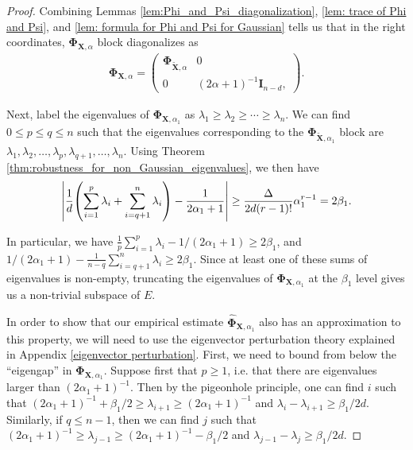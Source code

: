 \documentclass[final,12pt]{colt2018} %
\numberwithin{equation}{section}
\DeclarePairedDelimiter{\abs}{\lvert}{\rvert}
\DeclarePairedDelimiter{\paren}{(}{)}
\newcommand{\boldPhi}{\boldsymbol{\Phi}}
\newcommand{\boldI}{\textbf{I}}
\newcommand{\boldX}{\textbf{X}}
\begin{document}
\begin{proof}
	Combining Lemmas \ref{lem:Phi_and_Psi_diagonalization}, \ref{lem: trace of Phi and Psi}, and \ref{lem: formula for Phi and Psi for Gaussian} tells us that in the right coordinates, $\boldPhi_{\boldX,\alpha}$ block diagonalizes as
	\begin{align}
	\boldPhi_{\boldX,\alpha} = \left(
	\begin{array}{c|c}
	\boldPhi_{\tilde{\boldX},\alpha} & 0 \\
	\hline
	0 & (2\alpha+1)^{-1}\boldI_{n-d},
	\end{array}
	\right).
	\end{align}
	
	Next, label the eigenvalues of $\boldPhi_{\boldX,\alpha_1}$ as $\lambda_1 \geq \lambda_2 \geq \cdots \geq \lambda_n$. We can find $0 \leq p \leq q \leq n$ such that the eigenvalues corresponding to the $\boldPhi_{\tilde{\boldX},\alpha_1}$ block are $\lambda_1,\lambda_2,\ldots,\lambda_p,\lambda_{q+1},\ldots,\lambda_n$. Using Theorem \ref{thm:robustness_for_non_Gaussian_eigenvalues}, we then have
	\begin{equation}
	\abs*{\frac{1}{d}\paren*{\sum_{i=1}^p\lambda_i+\sum_{i=q+1}^n\lambda_i}-\frac{1}{2\alpha_1+1}} \geq \frac{\Delta}{2d(r-1)!}\alpha_1^{r-1} = 2\beta_1.
	\end{equation}
	
	In particular, we have $\frac{1}{p}\sum_{i=1}^p\lambda_i - 1/(2\alpha_1+1) \geq 2\beta_1$, and $1/(2\alpha_1+1) - \frac{1}{n-q}\sum_{i=q+1}^n\lambda_i \geq 2\beta_1$. Since at least one of these sums of eigenvalues is non-empty, truncating the eigenvalues of $\boldPhi_{\boldX,\alpha_1}$ at the $\beta_1$ level gives us a non-trivial subspace of $E$.
	
	In order to show that our empirical estimate $\hat{\boldPhi}_{\boldX,\alpha_1}$ also has an approximation to this property, we will need to use the eigenvector perturbation theory explained in Appendix \ref{eigenvector perturbation}. First, we need to bound from below the ``eigengap'' in $\boldPhi_{\boldX,\alpha_1}$. Suppose first that $p \geq 1$, i.e. that there are eigenvalues larger than $(2\alpha_1+1)^{-1}$. Then by the pigeonhole principle, one can find $i$ such that $(2\alpha_1+1)^{-1} + \beta_1/2 \geq \lambda_{i+1} \geq (2\alpha_1+1)^{-1}$ and $\lambda_i - \lambda_{i+1} \geq \beta_1/2d$. Similarly, if $q \leq n-1$, then we can find $j$ such that $(2\alpha_1+1)^{-1} \geq \lambda_{j-1} \geq (2\alpha_1+1)^{-1} - \beta_1/2$ and $\lambda_{j-1}-\lambda_j \geq \beta_1/2d$.
	

\end{proof}
\end{document}
